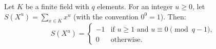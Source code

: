 Let $K$ be a finite field with $q$ elements. For an integer $u \geq 0$, let $S(X^u) = \sum_{x \in K} x^u$ (with the convention $0^0 = 1$). Then:
$$S(X^u) = \begin{cases} -1 & \text{if } u \geq 1 \text{ and } u \equiv 0 \pmod{q-1}, \\ 0 & \text{otherwise.} \end{cases}$$
